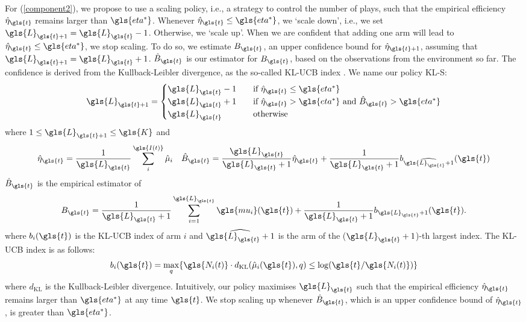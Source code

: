 For (\ref{component2}), we propose to use a scaling policy, i.e., a strategy to control the number of plays, such that the empirical efficiency $\hat{\eta}_{\gls{t}}$ remains larger than $\gls{eta^*}$. Whenever $\hat{\eta}_{\gls{t}} \leq \gls{eta^*}$, we `scale down', i.e., we set $\gls{L}_{\gls{t}+1} = \gls{L}_{\gls{t}} - 1$. Otherwise, we `scale up'. 
When we are confident that adding one arm will lead to $\hat{\eta}_{\gls{t}} \leq \gls{eta^*}$, we stop scaling. 
To do so, we estimate $B_{\gls{t}}$, an upper confidence bound for $\hat{\eta}_{\gls{t}+1}$, assuming that $\gls{L}_{\gls{t}+1} = \gls{L}_{\gls{t}} + 1$. $\hat{B}_{\gls{t}}$ is our estimator for $B_{\gls{t}}$, based on the observations from the environment so far. The confidence is derived from the Kullback-Leibler divergence, as the so-called \gls{KL-UCB} index \cite{DBLP:journals/jmlr/GarivierC11,DBLP:conf/alt/Maillard17}. 
We name our policy  \gls{KL-S}:
\begin{align}
\label{scalingpolicy_analysis}
\gls{L}_{\gls{t}+1} = 
\begin{cases}
\gls{L}_{\gls{t}}-1 
&\quad\text{if } \hat{\eta}_{\gls{t}}  \leq  \gls{eta^*}  \\
\gls{L}_{\gls{t}}+1
&\quad\text{if } \hat{\eta}_{\gls{t}} >  \gls{eta^*} \text{ and } \hat{B}_{\gls{t}} >  \gls{eta^*}\\ 
\gls{L}_{\gls{t}}
&\quad\text{otherwise} \\ 
\end{cases}
\end{align}
where $1 \leq \gls{L}_{\gls{t}+1} \leq  \gls{K}$ and
\begin{align}
\hat{\eta}_{\gls{t}} = \frac{1}{\gls{L}_{\gls{t}}} \sum_{i}^{\gls{I(t)}} \hat{\mu}_i &&
\hat{B}_{\gls{t}} = \frac{\gls{L}_{\gls{t}}}{\gls{L}_{\gls{t}}+1} \hat{\eta}_{\gls{t}} + \frac{1}{\gls{L}_{\gls{t}}+1} b_{\widehat{\gls{L}_{\gls{t}}+1}}(\gls{t})
\end{align}
$\hat{B}_{\gls{t}}$ is the empirical estimator of 
\[
B_{\gls{t}} = \frac{1}{\gls{L}_{\gls{t}}+1} \sum_{i=1}^{\gls{L}_{\gls{t}}} \gls{mu_i}(\gls{t}) + \frac{1}{\gls{L}_{\gls{t}}+1} b_{\gls{L}_{\gls{t}}+1}(\gls{t}).
\] 
where $b_i(\gls{t})$ is the  \gls{KL-UCB} index of arm $i$ and $\widehat{\gls{L}_{\gls{t}}+1}$ is the arm of the ($\gls{L}_{\gls{t}}+1$)-th largest index. The  \gls{KL-UCB} index is as follows: 
\begin{equation}
\label{kl-index}
b_i(\gls{t}) = \max_q \{  \gls{N_i(t)} \cdot d_{\text{KL}}(\hat{\mu}_i(\gls{t}), q) \le \log(\gls{t}/ \gls{N_i(t)})\}
\end{equation}
where $d_{\text{KL}}$ is the Kullback-Leibler divergence. Intuitively, our policy maximises $\gls{L}_{\gls{t}}$ such that the empirical efficiency $\hat{\eta}_{\gls{t}}$ remains larger than $ \gls{eta^*}$ at any time $\gls{t}$. We stop scaling up whenever $\hat{B}_{\gls{t}}$, which is an upper confidence bound of $\hat{\eta}_{\gls{t}}$, is greater than $ \gls{eta^*}$.

